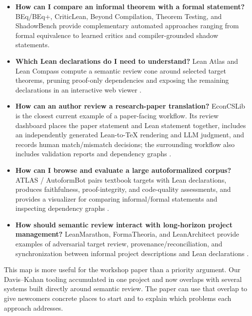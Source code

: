 \documentclass[11pt]{article}
\begin{document}
\begin{itemize}
  \item \textbf{How can I compare an informal theorem with a formal statement?}
  BEq/BEq+, CriticLean, Beyond Compilation, Theorem Testing, and ShadowBench
  provide complementary automated approaches ranging from formal equivalence to
  learned critics and compiler-grounded shadow statements.

  \item \textbf{Which Lean declarations do I need to understand?}  Lean Atlas
  and Lean Compass compute a semantic review cone around selected target
  theorems, pruning proof-only dependencies and exposing the remaining
  declarations in an interactive web viewer \citep{yanahama2026leanatlas}.

  \item \textbf{How can an author review a research-paper translation?}
  EconCSLib is the closest current example of a paper-facing workflow.  Its
  review dashboard places the paper statement and Lean statement together,
  includes an independently generated Lean-to-TeX rendering and LLM judgment,
  and records human match/mismatch decisions; the surrounding workflow also
  includes validation reports and dependency graphs \citep{garg2026econcs}.

  \item \textbf{How can I browse and evaluate a large autoformalized corpus?}
  ATLAS / AutoformBot pairs textbook targets with Lean declarations, produces
  faithfulness, proof-integrity, and code-quality assessments, and provides a
  visualizer for comparing informal/formal statements and inspecting dependency
  graphs \citep{rammal2026scale}.

  \item \textbf{How should semantic review interact with long-horizon project
  management?}  LeanMarathon, FormaTheoria, and LeanArchitect provide examples
  of adversarial target review, provenance/reconciliation, and synchronization
  between informal project descriptions and Lean declarations
  \citep{zhang2026leanmarathon,nie2026formatheoria,zhu2026leanarchitect}.
\end{itemize}

This map is more useful for the workshop paper than a priority argument.  Our
Davis--Kahan tooling accumulated in one project and now overlaps with several
systems built directly around semantic review.  The paper can use that overlap
to give newcomers concrete places to start and to explain which problems each
approach addresses.
\end{document}
